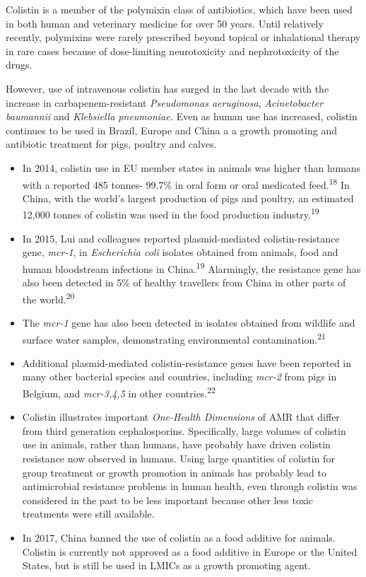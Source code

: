 \documentclass[
]{book}
\begin{document}
Colistin is a member of the polymixin class of antibiotics, which have been used in both human and veterinary medicine for over 50 years. Until relatively recently, polymixins were rarely prescribed beyond topical or inhalational therapy in rare cases because of dose-limiting neurotoxicity and nephrotoxicity of the drugs.

However, use of intravenous colistin has surged in the last decade with the increase in carbapenem-resistant \emph{Pseudomonas aeruginosa}, \emph{Acinetobacter baumannii} and \emph{Klebsiella pneumoniae.} Even as human use has increased, colistin continues to be used in Brazil, Europe and China a a growth promoting and antibiotic treatment for pigs, poultry and calves.

\begin{itemize}
\item
  In 2014, colistin use in EU member states in animals was higher than humans with a reported 485 tonnes- 99.7\% in oral form or oral medicated feed.\textsuperscript{18} In China, with the world's largest production of pigs and poultry, an estimated 12,000 tonnes of colistin was used in the food production industry.\textsuperscript{19}
\item
  In 2015, Lui and colleagues reported plasmid-mediated colistin-resistance gene, \emph{mcr-1}, in \emph{Escherichia coli} isolates obtained from animals, food and human bloodstream infections in China.\textsuperscript{19} Alarmingly, the resistance gene has also been detected in 5\% of healthy travellers from China in other parts of the world.\textsuperscript{20}
\item
  The \emph{mcr-1} gene has also been detected in isolates obtained from wildlife and surface water samples, demonstrating environmental contamination.\textsuperscript{21}
\item
  Additional plasmid-mediated colistin-resistance genes have been reported in many other bacterial species and countries, including \emph{mcr-2} from pigs in Belgium, and \emph{mcr-3,4,5} in other countries.\textsuperscript{22}
\item
  Colistin illustrates important \emph{One-Health Dimensions} of AMR that differ from third generation cephalosporins. Specifically, large volumes of colistin use in animals, rather than humans, have probably have driven colistin resistance now observed in humans. Using large quantities of colistin for group treatment or growth promotion in animals has probably lead to antimicrobial resistance problems in human health, even through colistin was considered in the past to be less important because other less toxic treatments were still available.
\item
  In 2017, China banned the use of colistin as a food additive for animals. Colistin is currently not approved as a food additive in Europe or the United States, but is still be used in LMICs as a growth promoting agent.
\end{itemize}
\end{document}
